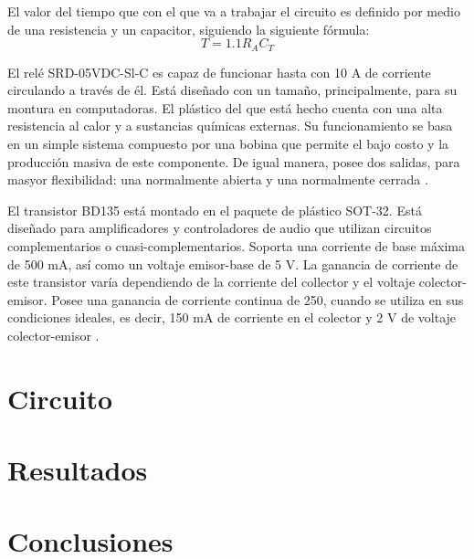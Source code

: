 \documentclass{article}
\begin{document}
El valor del tiempo que con el que va a trabajar el circuito es definido por medio de una resistencia y un capacitor, siguiendo la siguiente fórmula:
\begin{equation}
    T = 1.1 R_A C_T
\end{equation}

El relé SRD-05VDC-Sl-C es  capaz de funcionar hasta con 10 A de corriente circulando a través de él. Está diseñado con un tamaño, principalmente, para su montura en computadoras. El plástico del que está hecho cuenta con una alta resistencia al calor y a sustancias químicas externas. Su funcionamiento se basa en un simple sistema compuesto por una bobina que permite el bajo costo y la producción masiva de este componente. De igual manera, posee dos salidas, para masyor flexibilidad: una normalmente abierta y una normalmente cerrada \parencite{alldatasheet_srd-05vdc-sl-c_nodate}.

El transistor BD135 está montado en el paquete de plástico SOT-32. Está diseñado para amplificadores y controladores de audio que utilizan circuitos complementarios o cuasi-complementarios. Soporta una corriente de base máxima de 500 mA, así como un voltaje emisor-base de 5 V. La ganancia de corriente de este transistor varía dependiendo de la corriente del collector y el voltaje colector-emisor. Posee una ganancia de corriente continua de 250, cuando se utiliza en sus condiciones ideales, es decir, 150 mA de corriente en el colector y 2 V de voltaje colector-emisor \parencite{stmicroelectronics_bd135_nodate}.

\section{Circuito}



\section{Resultados}
\section{Conclusiones}

\printbibliography
\end{document}
